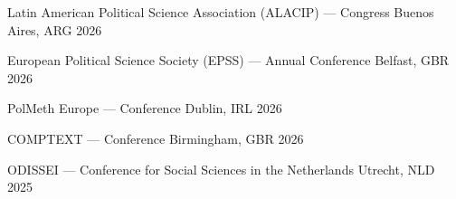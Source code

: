 






\vspace{1mm}

\begin{cvhonors}
\cvconf
{Latin American Political Science Association (ALACIP) --- Congress} 
{Buenos Aires, ARG}
{2026}
\end{cvhonors}

\begin{cvhonors}
\cvconf
{European Political Science Society (EPSS) --- Annual Conference} 
{Belfast, GBR}
{2026}
\end{cvhonors}

\begin{cvhonors}
\cvconf
{PolMeth Europe --- Conference} 
{Dublin, IRL}
{2026}
\end{cvhonors}

\begin{cvhonors}
\cvconf
{COMPTEXT --- Conference} 
{Birmingham, GBR}
{2026}
\end{cvhonors}

\begin{cvhonors}
\cvconf
{ODISSEI --- Conference for Social Sciences in the Netherlands} 
{Utrecht, NLD}
{2025}
\end{cvhonors}

